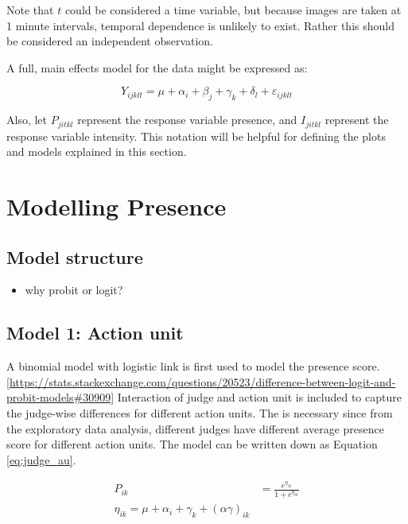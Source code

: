 \documentclass{monashthesis}
\begin{document}
Note that \(t\) could be considered a time variable, but because images are taken at 1 minute intervals, temporal dependence is unlikely to exist. Rather this should be considered an independent observation.

A full, main effects model for the data might be expressed as:

\[Y_{ijklt} = \mu + \alpha_i + \beta_j + \gamma_k + \delta_l + \varepsilon_{ijklt}\]

\noindent Also, let \(P_{jitkl}\) represent the response variable presence, and \(I_{jitkl}\) represent the response variable intensity. This notation will be helpful for defining the plots and models explained in this section.

\hypertarget{modelling-presence}{%
\section{Modelling Presence}\label{modelling-presence}}

\hypertarget{model-structure}{%
\subsection{Model structure}\label{model-structure}}

\begin{itemize}
\tightlist
\item
  why probit or logit?
\end{itemize}

\hypertarget{model-1-action-unit}{%
\subsection{Model 1: Action unit}\label{model-1-action-unit}}

A binomial model with logistic link is first used to model the presence score.{[}\url{https://stats.stackexchange.com/questions/20523/difference-between-logit-and-probit-models\#30909}{]} Interaction of judge and action unit is included to capture the judge-wise differences for different action units. The is necessary since from the exploratory data analysis, different judges have different average presence score for different action units. The model can be written down as Equation \ref{eq:judge_au}.

\begin{align}\label{eq:judge_au}
P_{ik} &= \frac{e^{\eta_{ik}}}{1 + e^{\eta_{ik}}} \\
\eta_{ik} = \mu + \alpha_i + \gamma_k + (\alpha\gamma)_{ik}
\end{align}
\end{document}
